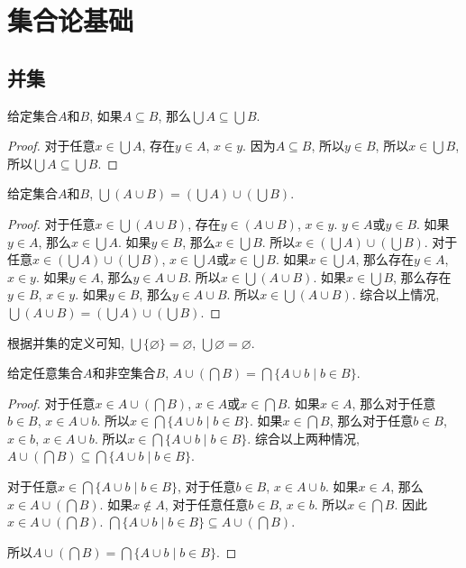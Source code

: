 \chapter{集合论基础}
\section{并集}
\begin{proposition}
	给定集合$A$和$B$, 如果$A\subseteq B$, 那么$\bigcup A\subseteq \bigcup B$.
\end{proposition}

\begin{proof}
	对于任意$x\in \bigcup A$, 存在$y\in A$, $x\in y$. 因为$A\subseteq B$, 所以$y\in B$, 所以$x\in \bigcup B$, 所以$\bigcup A\subseteq \bigcup B$.
\end{proof}

\begin{proposition}
	给定集合$A$和$B$, $\bigcup (A\cup B)=(\bigcup A)\cup (\bigcup B)$.
\end{proposition}

\begin{proof}
	对于任意$x\in \bigcup (A\cup B)$, 存在$y\in (A\cup B)$, $x\in y$. $y\in A$或$y\in B$. 如果$y\in A$, 那么$x\in \bigcup A$. 如果$y\in B$, 那么$x\in \bigcup B$. 所以$x\in (\bigcup A)\cup (\bigcup B)$. 对于任意$x\in (\bigcup A)\cup (\bigcup B)$, $x\in \bigcup A$或$x\in \bigcup B$. 如果$x\in \bigcup A$, 那么存在$y\in A$, $x\in y$. 如果$y\in A$, 那么$y\in A\cup B$. 所以$x\in \bigcup (A\cup B)$. 如果$x\in \bigcup B$, 那么存在$y\in B$, $x\in y$. 如果$y\in B$, 那么$y\in A\cup B$. 所以$x\in \bigcup (A\cup B)$. 综合以上情况, $\bigcup (A\cup B)=(\bigcup A)\cup (\bigcup B)$.
\end{proof}

根据并集的定义可知, $\bigcup \{\varnothing\}=\varnothing$, $\bigcup \varnothing=\varnothing$.

\begin{proposition}
	给定任意集合$A$和非空集合$B$, $A\cup (\bigcap B)=\bigcap \{A\cup b\mid b\in B\}$.
\end{proposition}

\begin{proof}
	对于任意$x\in A\cup (\bigcap B)$, $x\in A$或$x\in \bigcap B$. 如果$x\in A$, 那么对于任意$b\in B$, $x\in A\cup b$. 所以$x\in \bigcap \{A\cup b\mid b\in B\}$. 如果$x\in \bigcap B$, 那么对于任意$b\in B$, $x\in b$, $x\in A\cup b$. 所以$x\in \bigcap \{A\cup b\mid b\in B\}$. 综合以上两种情况, $A\cup (\bigcap B)\subseteq \bigcap \{A\cup b\mid b\in B\}$.

	对于任意$x\in \bigcap \{A\cup b\mid b\in B\}$, 对于任意$b\in B$, $x\in A\cup b$. 如果$x\in A$, 那么$x\in A\cup (\bigcap B)$. 如果$x\notin A$, 对于任意任意$b\in B$, $x\in b$. 所以$x\in \bigcap B$. 因此$x\in A\cup (\bigcap B)$. $\bigcap \{A\cup b\mid b\in B\}\subseteq A\cup (\bigcap B)$.

	所以$A\cup (\bigcap B)=\bigcap \{A\cup b\mid b\in B\}$.
\end{proof}

